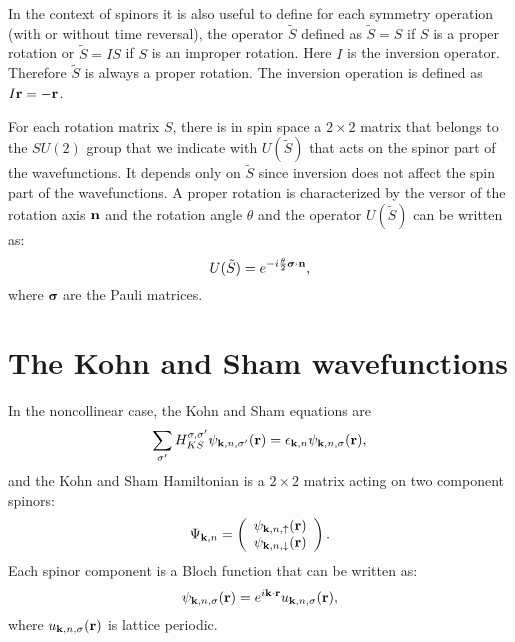 \documentclass[12pt,a4paper,twoside]{report}
\begin{document}
In the context of spinors it is also useful to define for each symmetry operation (with or without time reversal), the operator $\tilde S$ defined as $\tilde S=S$ if $S$ is a proper rotation or $\tilde S= I S$ if $S$ is an improper rotation. Here $I$ is the inversion operator. Therefore $\tilde S$ is always a proper rotation. The inversion operation is defined as $I {\bf r }=-{\bf r}$.

For each rotation matrix $S$, there is in spin space a $2\times 2$ matrix that belongs to the $SU(2)$ group that we indicate with $U(\tilde S)$ that acts on the spinor part of the wavefunctions. It depends only on $\tilde S$ since inversion does not affect the spin part of the wavefunctions.
A proper rotation is characterized by the versor of the
rotation axis ${\bf n}$ and the rotation angle
$\theta$ and the operator $U(\tilde S)$ can be written as:
\begin{equation}
U(\tilde S)= e^{-i {\theta \over 2} \boldsymbol{\sigma} \cdot {\bf n} },
\end{equation}
where $\boldsymbol{\sigma}$ are the Pauli matrices. 

\section{The Kohn and Sham wavefunctions}

In the noncollinear case, the Kohn and Sham equations are
\begin{equation}
\sum_{\sigma'} H_{KS}^{\sigma,\sigma'}
\psi_{{\bf k},n,\sigma'}({\bf r})=
\epsilon_{{\bf k},n} \psi_{{\bf k},n,\sigma}({\bf r}),
\end{equation}
and the Kohn and Sham Hamiltonian is a $2\times 2$ matrix acting on two component spinors:
\begin{equation}
\Psi_{{\bf k},n}= \left( \begin{array}{c}
\psi_{{\bf k},n,\uparrow}({\bf r})  \\
\psi_{{\bf k},n,\downarrow} ({\bf r})
\end{array}
\right).
\end{equation}
Each spinor component is a Bloch function that
can be written as:
\begin{equation}
\psi_{{\bf k},n,\sigma}({\bf r})=
e^{i{\bf k}\cdot {\bf r}} u_{{\bf k},n,\sigma}({\bf r}),
\end{equation}
where $u_{{\bf k},n,\sigma}({\bf r})$ is lattice periodic.
\end{document}
